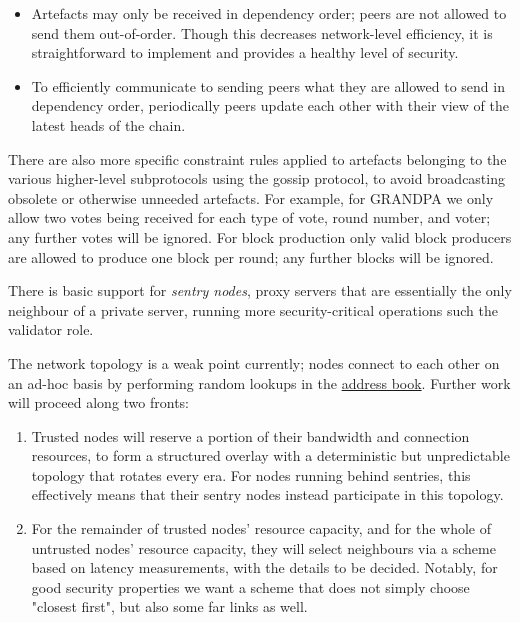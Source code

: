 \documentclass{article}
\begin{document}
\begin{itemize}
	\item Artefacts may only be received in dependency order; peers are not allowed to send them out-of-order. Though this decreases network-level efficiency, it is straightforward to implement and provides a healthy level of security.
	\item To efficiently communicate to sending peers what they are allowed to send in dependency order, periodically peers update each other with their view of the latest heads of the chain.
\end{itemize}

There are also more specific constraint rules applied to artefacts belonging to the various higher-level subprotocols using the gossip protocol, to avoid broadcasting obsolete or otherwise unneeded artefacts. For example, for GRANDPA we only allow two votes being received for each type of vote, round number, and voter; any further votes will be ignored. For block production only valid block producers are allowed to produce one block per round; any further blocks will be ignored.

There is basic support for \emph{sentry nodes}, proxy servers that are essentially the only neighbour of a private server, running more security-critical operations such the validator role.

The network topology is a weak point currently; nodes connect to each other on an ad-hoc basis by performing random lookups in the \hyperref[sec:net_lowlevel]{address book}. Further work will proceed along two fronts:

\begin{enumerate}
	\item Trusted nodes will reserve a portion of their bandwidth and connection resources, to form a structured overlay with a deterministic but unpredictable topology that rotates every era. For nodes running behind sentries, this effectively means that their sentry nodes instead participate in this topology.
	
	\item For the remainder of trusted nodes' resource capacity, and for the whole of untrusted nodes' resource capacity, they will select neighbours via a scheme based on latency measurements, with the details to be decided. Notably, for good security properties we want a scheme that does not simply choose "closest first", but also some far links as well.
\end{enumerate}
\end{document}
